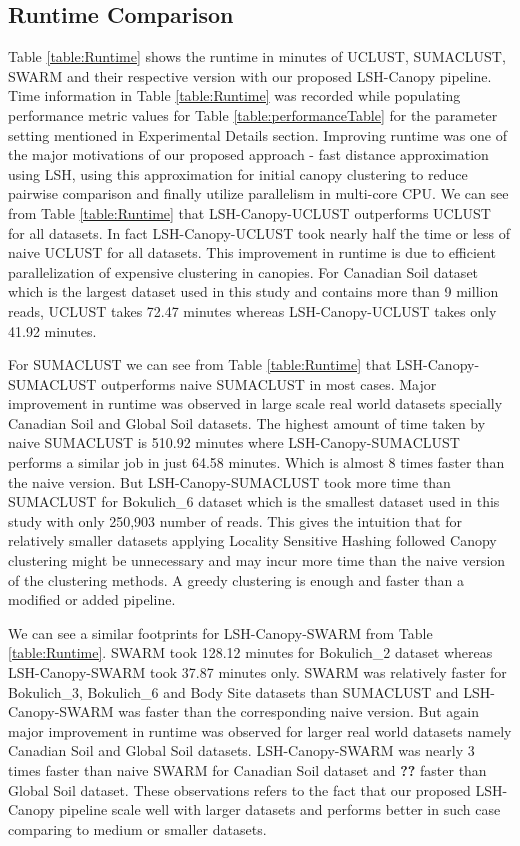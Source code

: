 \documentclass[10pt, conference, compsocconf]{IEEEtran}
\begin{document}
\subsection{\textbf{Runtime Comparison}} Table \ref{table:Runtime} shows the runtime in minutes of UCLUST, SUMACLUST, SWARM and their respective version with our proposed LSH-Canopy pipeline. Time information in Table \ref{table:Runtime} was recorded while populating performance metric values for Table \ref{table:performanceTable} for the parameter setting mentioned in Experimental Details section. Improving runtime was one of the major motivations of our proposed approach - fast distance approximation using LSH, using this approximation for initial canopy clustering to reduce pairwise comparison and finally utilize parallelism in multi-core CPU. We can see from Table \ref{table:Runtime} that LSH-Canopy-UCLUST outperforms UCLUST for all datasets. In fact LSH-Canopy-UCLUST took nearly half the time or less of naive UCLUST for all datasets. This improvement in runtime is due to efficient parallelization of expensive clustering in canopies. For Canadian Soil dataset which is the largest dataset used in this study and contains more than 9 million reads, UCLUST takes 72.47 minutes whereas LSH-Canopy-UCLUST takes only 41.92 minutes.

For SUMACLUST we can see from Table \ref{table:Runtime} that LSH-Canopy-SUMACLUST outperforms naive SUMACLUST in most cases. Major improvement in runtime was observed in large scale real world datasets specially Canadian Soil and Global Soil datasets. The highest amount of time taken by naive SUMACLUST is 510.92 minutes where LSH-Canopy-SUMACLUST performs a similar job in just 64.58 minutes. Which is almost 8 times faster than the naive version. But LSH-Canopy-SUMACLUST took more time than SUMACLUST for Bokulich\_6 dataset which is the smallest dataset used in this study with only 250,903 number of reads. This gives the intuition that for relatively smaller datasets applying Locality Sensitive Hashing followed Canopy clustering might be unnecessary and may incur more time than the naive version of the clustering methods. A greedy clustering is enough and faster than a modified or added pipeline.

We can see a similar footprints for LSH-Canopy-SWARM from Table \ref{table:Runtime}. SWARM took 128.12 minutes for Bokulich\_2 dataset whereas LSH-Canopy-SWARM took 37.87 minutes only. SWARM was relatively faster for Bokulich\_3, Bokulich\_6 and Body Site datasets than SUMACLUST and LSH-Canopy-SWARM was faster than the corresponding naive version. But again major improvement in runtime was observed for larger real world datasets namely Canadian Soil and Global Soil datasets. LSH-Canopy-SWARM was nearly 3 times faster than naive SWARM for Canadian Soil dataset and \textbf{??} faster than Global Soil dataset. These observations refers to the fact that our proposed LSH-Canopy pipeline scale well with larger datasets and performs better in such case comparing to medium or smaller datasets.     
   
\end{document}
